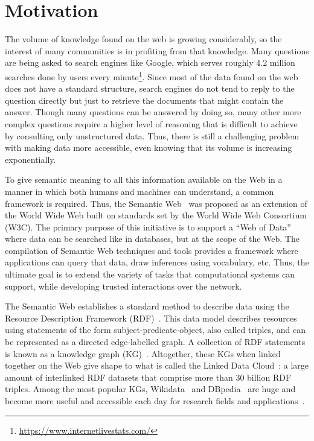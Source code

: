 \section{Motivation}
The volume of knowledge found on the web is growing considerably, so the interest of many 
communities is in profiting from that knowledge. Many questions are being asked  
to search engines like Google, which serves roughly 4.2 million searches done by users every 
minute\footnote{\href{https://www.internetlivestats.com/}{https://www.internetlivestats.com/}}. 
Since most of the data found on the web does not have a standard structure, 
search engines do not tend to reply to the question directly but just to retrieve the documents 
that might contain the answer. Though many questions can be answered by doing so, many 
other more complex questions require a higher level of reasoning that is difficult to achieve 
by consulting only unstructured data. Thus, there is still a challenging problem with making 
data more accessible, even knowing that its volume is increasing exponentially.

To give semantic meaning to all this information available on the Web in a manner in which both 
humans and machines can understand, a common framework is required. Thus, 
the Semantic Web~\cite{key:semwebsa} was proposed as an extension of the World Wide Web built on 
standards set by the World Wide Web Consortium (W3C). The primary purpose of this 
initiative is to support a “Web of Data” where data can be searched like in databases, but 
at the scope of the Web. The compilation of Semantic Web techniques and tools provides 
a framework where applications can query that data, draw inferences using vocabulary, etc. 
Thus, the ultimate goal is to extend the variety of tasks that computational systems can 
support, while developing trusted interactions over the network. 

The Semantic Web establishes a standard method to describe data using the Resource 
Description Framework (RDF)~\cite{key:rdfprimer11}. This data model describes resources using statements 
of the form subject-predicate-object, also called triples, and can be represented as a directed 
edge-labelled graph. A collection of RDF statements is known as a knowledge graph (KG)~\cite{key:ldbook}. 
Altogether, these KGs when linked together on the Web give shape to what is called 
the Linked Data Cloud~\cite{key:ldprinciples}: a large amount of interlinked RDF datasets that comprise more 
than 30 billion RDF triples. Among the most popular KGs, Wikidata~\cite{KG:wikidata} and DBpedia~\cite{KG:dbpedia} 
are huge and become more useful and accessible each day for research fields and applications~\cite{wikidata:usage-MalyshevKGGB18, EL:dbpedia-spotlight-MendesJGB11}. 

